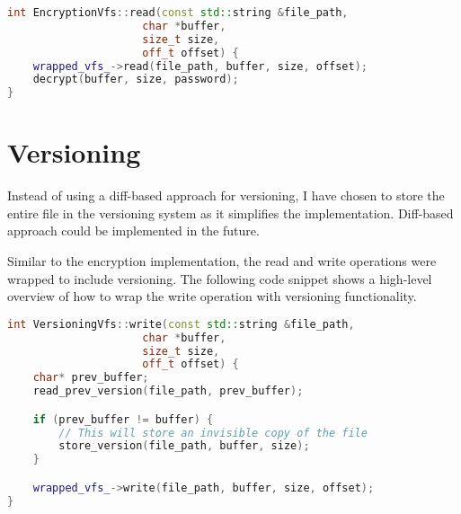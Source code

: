 \begin{lstlisting}[language=c++, basicstyle=\ttfamily\small, caption={Wrapping the read operation with encryption.}, label={lst:read}]
int EncryptionVfs::read(const std::string &file_path,
                     char *buffer,
                     size_t size,
                     off_t offset) {
    wrapped_vfs_->read(file_path, buffer, size, offset);
    decrypt(buffer, size, password);
}
\end{lstlisting}



\section{Versioning}\label{sec:versioning2}

Instead of using a diff-based approach for versioning, I have chosen to store the entire file in the versioning system as it simplifies the implementation.
Diff-based approach could be implemented in the future.

Similar to the encryption implementation, the read and write operations were wrapped to include versioning.
The following code snippet shows a high-level overview of how to wrap the write operation with versioning functionality.

\begin{lstlisting}[language=c++, basicstyle=\ttfamily\small]
int VersioningVfs::write(const std::string &file_path,
                     char *buffer,
                     size_t size,
                     off_t offset) {
    char* prev_buffer;
    read_prev_version(file_path, prev_buffer);

    if (prev_buffer != buffer) {
        // This will store an invisible copy of the file
        store_version(file_path, buffer, size);
    }

    wrapped_vfs_->write(file_path, buffer, size, offset);
}
\end{lstlisting}